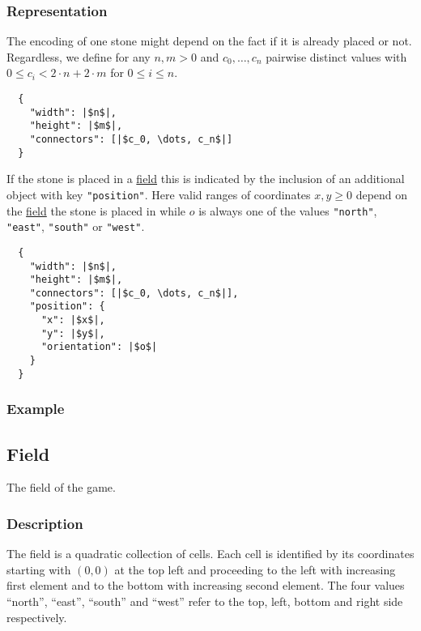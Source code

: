 \documentclass{scrartcl}
\begin{document}
\subsubsection{Representation}
The encoding of one stone might depend on the fact if it is already placed or 
not. Regardless, we define for any $n,m > 0$ and $c_{0}, \dots, c_{n}$ pairwise
distinct values with $0 \leq c_{i} < 2\cdot n + 2\cdot m$ for $0\leq i\leq n$.
\begin{verbatim}
  {
    "width": |$n$|,
    "height": |$m$|,
    "connectors": [|$c_0, \dots, c_n$|]
  }
\end{verbatim}
If the stone is placed in a \hyperlink{field}{field} this is indicated by the 
inclusion of an additional object with key \texttt{"position"}. Here 
valid ranges of coordinates $x, y \geq 0$ depend on the 
\hyperlink{field}{field} the stone is placed in while $o$ is always one of the 
values \texttt{"north"}, \texttt{"east"}, 
\texttt{"south"} or \texttt{"west"}.
\begin{verbatim}
  {
    "width": |$n$|,
    "height": |$m$|,
    "connectors": [|$c_0, \dots, c_n$|],
    "position": {
      "x": |$x$|,
      "y": |$y$|,
      "orientation": |$o$|
    }
  }
\end{verbatim}
\subsubsection{Example}

\subsection{Field}
The \hypertarget{field}{field} of the game.

\subsubsection{Description}
The field is a quadratic collection of cells. Each cell is identified by its 
coordinates starting with $(0,0)$ at the top left and proceeding to the left 
with increasing first element and to the bottom with increasing second element.
The four values \enquote{north}, \enquote{east}, \enquote{south} and 
\enquote{west} refer to the top, left, bottom and right side respectively.
\end{document}
